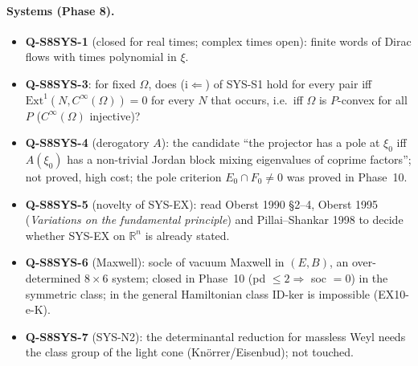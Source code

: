 \documentclass[11pt]{article}
\theoremstyle{plain}
\theoremstyle{definition}
\theoremstyle{remark}
\newcommand{\R}{\mathbb{R}}
\begin{document}
\paragraph{Systems (Phase 8).}
\begin{itemize}
\item \textbf{Q-S8SYS-1} (closed for real times; complex times open): finite words of Dirac flows with times polynomial in $\xi$.
\item \textbf{Q-S8SYS-3}: for fixed $\Omega$, does (i$\Leftarrow$) of SYS-S1 hold for every pair iff $\mathrm{Ext}^1(N,C^\infty(\Omega))=0$ for every $N$ that occurs, i.e.\ iff $\Omega$ is $P$-convex for all $P$ ($C^\infty(\Omega)$ injective)?
\item \textbf{Q-S8SYS-4} (derogatory $A$): the candidate ``the projector has a pole at $\xi_0$ iff $A(\xi_0)$ has a non-trivial Jordan block mixing eigenvalues of coprime factors''; not proved, high cost; the pole criterion $E_0\cap F_0\ne0$ was proved in Phase~10.
\item \textbf{Q-S8SYS-5} (novelty of SYS-EX): read Oberst 1990 \S2--4, Oberst 1995 (\emph{Variations on the fundamental principle}) and Pillai--Shankar 1998 to decide whether SYS-EX on $\R^n$ is already stated.
\item \textbf{Q-S8SYS-6} (Maxwell): socle of vacuum Maxwell in $(E,B)$, an over-determined $8\times6$ system; closed in Phase~10 (pd $\le2\Rightarrow$ soc $=0$) in the symmetric class; in the general Hamiltonian class ID-ker is impossible (EX10-e-K).
\item \textbf{Q-S8SYS-7} (SYS-N2): the determinantal reduction for massless Weyl needs the class group of the light cone (Kn\"orrer/Eisenbud); not touched.
\end{itemize}
\end{document}
